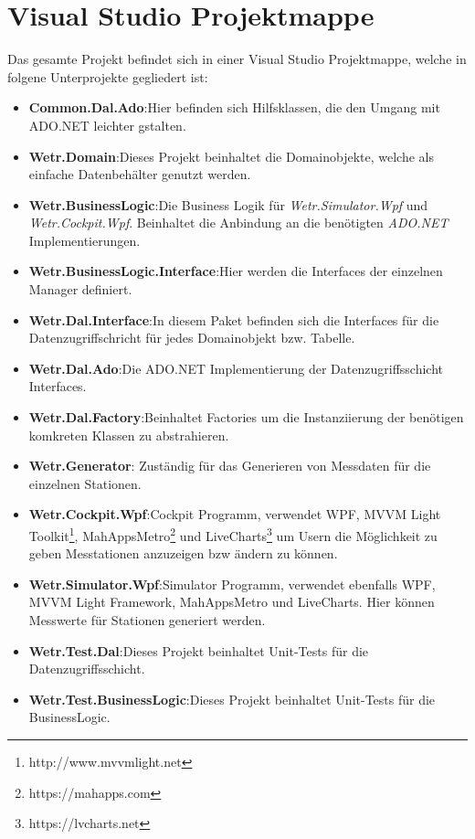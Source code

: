 \section{Visual Studio Projektmappe}

Das gesamte Projekt befindet sich in einer Visual Studio Projektmappe, welche in folgene Unterprojekte gegliedert ist:
\begin{itemize}
    \item \textbf{Common.Dal.Ado}:\newline Hier befinden sich Hilfsklassen, die den Umgang mit ADO.NET leichter gstalten.
    \item \textbf{Wetr.Domain}:\newline Dieses Projekt beinhaltet die Domainobjekte, welche als einfache Datenbehälter genutzt werden.
    \item \textbf{Wetr.BusinessLogic}:\newline Die Business Logik für \textit{Wetr.Simulator.Wpf} und \textit{Wetr.Cockpit.Wpf}. Beinhaltet die Anbindung an die benötigten \textit{ADO.NET} Implementierungen.
    \item \textbf{Wetr.BusinessLogic.Interface}:\newline Hier werden die Interfaces der einzelnen Manager definiert.
    \item \textbf{Wetr.Dal.Interface}:\newline In diesem Paket befinden sich die Interfaces für die Datenzugriffschricht für jedes Domainobjekt bzw. Tabelle.
    \item \textbf{Wetr.Dal.Ado}:\newline Die ADO.NET Implementierung der Datenzugriffsschicht Interfaces.
    \item \textbf{Wetr.Dal.Factory}:\newline Beinhaltet Factories um die Instanziierung der benötigen komkreten Klassen zu abstrahieren.
    \item \textbf{Wetr.Generator}: Zuständig für das Generieren von Messdaten für die einzelnen Stationen.
    \item \textbf{Wetr.Cockpit.Wpf}:\newline Cockpit Programm, verwendet WPF, MVVM Light Toolkit\footnote{http://www.mvvmlight.net}, MahAppsMetro\footnote{https://mahapps.com} und LiveCharts\footnote{https://lvcharts.net} um Usern die Möglichkeit zu geben Messtationen anzuzeigen bzw ändern zu können.
    \item \textbf{Wetr.Simulator.Wpf}:\newline Simulator Programm, verwendet ebenfalls WPF, MVVM Light Framework, MahAppsMetro und LiveCharts. Hier können Messwerte für Stationen generiert werden.
    \item \textbf{Wetr.Test.Dal}:\newline Dieses Projekt beinhaltet Unit-Tests für die Datenzugriffsschicht.
    \item \textbf{Wetr.Test.BusinessLogic}:\newline Dieses Projekt beinhaltet Unit-Tests für die BusinessLogic.
\end{itemize}

